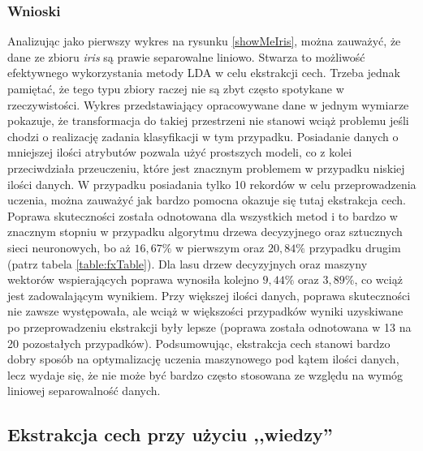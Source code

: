 \subsubsection{Wnioski}
Analizując jako pierwszy wykres na rysunku \ref{showMeIris}, można zauważyć, że dane ze zbioru \textit{iris} są prawie separowalne liniowo. Stwarza to możliwość efektywnego wykorzystania metody LDA w celu ekstrakcji cech. Trzeba jednak pamiętać, że tego typu zbiory raczej nie są zbyt często spotykane w rzeczywistości. Wykres przedstawiający opracowywane dane w jednym wymiarze pokazuje, że transformacja do takiej przestrzeni nie stanowi wciąż problemu jeśli chodzi o realizację zadania klasyfikacji w tym przypadku. Posiadanie danych o mniejszej ilości atrybutów pozwala użyć prostszych modeli, co z kolei przeciwdziała przeuczeniu, które jest znacznym problemem w przypadku niskiej ilości danych. W przypadku posiadania tylko 10 rekordów w celu przeprowadzenia uczenia, można zauważyć jak bardzo pomocna okazuje się tutaj ekstrakcja cech. Poprawa skuteczności została odnotowana dla wszystkich metod i to bardzo w znacznym stopniu w przypadku algorytmu drzewa decyzyjnego oraz sztucznych sieci neuronowych, bo aż $16,67 \%$ w pierwszym oraz $20,84 \%$ przypadku drugim (patrz tabela \ref{table:fxTable}). Dla lasu drzew decyzyjnych oraz maszyny wektorów wspierających poprawa wynosiła kolejno $9,44 \%$ oraz $3,89 \%$, co wciąż jest zadowalającym wynikiem. Przy większej ilości danych, poprawa skuteczności nie zawsze występowała, ale wciąż w większości przypadków wyniki uzyskiwane po przeprowadzeniu ekstrakcji były lepsze (poprawa została odnotowana w 13 na 20 pozostałych przypadków). Podsumowując, ekstrakcja cech stanowi bardzo dobry sposób na optymalizację uczenia maszynowego pod kątem ilości danych, lecz wydaje się, że nie może być bardzo często stosowana ze względu na wymóg liniowej separowalność danych.

\subsection{Ekstrakcja cech przy użyciu ,,wiedzy''}
